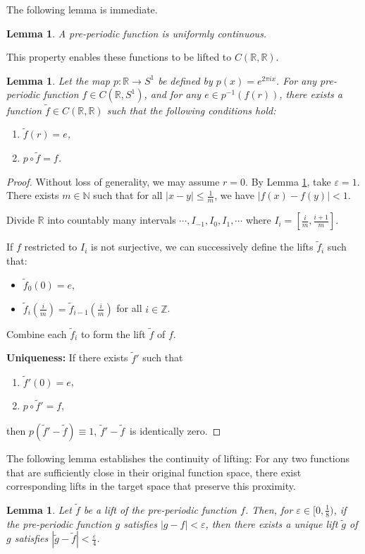 \documentclass[11pt]{article}
\newtheorem{lemma}[theorem]{Lemma}     %
\theoremstyle{remark}
\begin{document}
The following lemma is immediate.
\begin{lemma}\label{unc}
A pre-periodic function is uniformly continuous.
\end{lemma}
This property enables these functions to be  lifted to \(C(\mathbb{R,\mathbb{R}})\).
\begin{lemma}\label{lift}
    Let the map \( p: \mathbb{R} \to S^1 \) be defined by \( p(x) = e^{2\pi ix} \). For any pre-periodic function \( f \in C(\mathbb{R}, S^1) \), and for any \( e \in p^{-1}(f(r)) \), there exists a function \( \tilde{f} \in C(\mathbb{R}, \mathbb{R}) \) such that the following conditions hold:
\begin{enumerate}
    \item \( \tilde{f}(r) = e \),
    \item \( p \circ \tilde{f} = f \).
\end{enumerate}
\end{lemma}
\begin{proof}
    Without loss of generality, we may assume \( r = 0 \). By Lemma \ref{unc}, take \( \varepsilon = 1 \). There exists \( m \in \mathbb{N} \) such that for all \( |x - y| \leq \frac{1}{m} \), we have \( |f(x) - f(y)| < 1 \).

Divide \( \mathbb{R} \) into countably many intervals \( \cdots, I_{-1}, I_0, I_1, \cdots \) where \( I_i = \left[\frac{i}{m}, \frac{i+1}{m}\right] \).

If \( f \) restricted to \( I_i \) is not surjective, we can successively define the lifts \( \tilde{f}_i \) such that:
\begin{itemize}
    \item \( \tilde{f}_0(0) = e \),
    \item \( \tilde{f}_i\left(\frac{i}{m}\right) = \tilde{f}_{i-1}\left(\frac{i}{m}\right) \) for all \( i \in \mathbb{Z} \).
\end{itemize}

Combine each \( \tilde{f}_i \) to form the lift \( \tilde{f} \) of \( f \).

\textbf{Uniqueness:} If there exists \( \tilde{f}' \) such that
\begin{enumerate}
    \item \( \tilde{f}'(0) = e \),
    \item \( p \circ \tilde{f}' = f \),
\end{enumerate}
then \( p(\tilde{f}' - \tilde{f}) \equiv 1\), \( \tilde{f}' - \tilde{f} \)\ is identically zero.
\end{proof}
The following lemma establishes the continuity of lifting: For any two functions that are sufficiently close in their original function space, there exist corresponding lifts in the target space that preserve this proximity. 
\begin{lemma}\label{lift8}
Let \( \tilde{f} \) be a lift of the pre-periodic function \( f \). Then, for \( \varepsilon \in [0, \frac{1}{8}) \), if the pre-periodic function \( g \) satisfies \( |g - f| < \varepsilon \), then there exists a unique lift \( \tilde{g} \) of \( g \) satisfies \( |\tilde{g} - \tilde{f}| < \frac{\varepsilon}{4}\).
\end{lemma}
\end{document}
